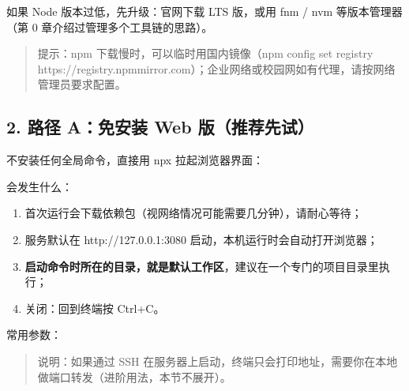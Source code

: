 如果 Node 版本过低，先升级：官网下载 LTS 版，或用 fnm / nvm
等版本管理器（第 0 章介绍过管理多个工具链的思路）。

\begin{quote}
提示：npm 下载慢时，可以临时用国内镜像（npm config set registry
https://registry.npmmirror.com）；企业网络或校园网如有代理，请按网络管理员要求配置。
\end{quote}

\subsection{2. 路径 A：免安装 Web
版（推荐先试）}\label{ux8defux5f84-aux514dux5b89ux88c5-web-ux7248ux63a8ux8350ux5148ux8bd5}

不安装任何全局命令，直接用 npx 拉起浏览器界面：

\begin{Shaded}
\begin{Highlighting}[]
\end{Highlighting}
\end{Shaded}

会发生什么：

\begin{enumerate}
\def\labelenumi{\arabic{enumi}.}
\tightlist
\item
  首次运行会下载依赖包（视网络情况可能需要几分钟），请耐心等待；
\item
  服务默认在 http://127.0.0.1:3080 启动，本机运行时会自动打开浏览器；
\item
  \textbf{启动命令时所在的目录，就是默认工作区}，建议在一个专门的项目目录里执行；
\item
  关闭：回到终端按 Ctrl+C。
\end{enumerate}

常用参数：

\begin{Shaded}
\begin{Highlighting}[]
      
         
\end{Highlighting}
\end{Shaded}

\begin{quote}
说明：如果通过 SSH
在服务器上启动，终端只会打印地址，需要你在本地做端口转发（进阶用法，本节不展开）。
\end{quote}

